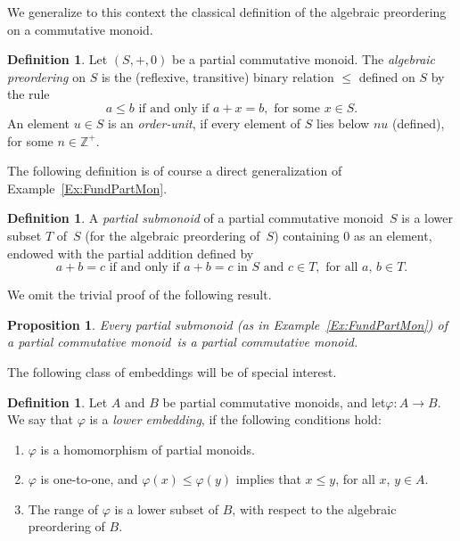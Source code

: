 \documentclass[psamsfonts,reqno]{memo-l}
\theoremstyle{plain}
\newtheorem{proposition}[lemma]{Proposition}
\theoremstyle{definition}
\newtheorem{definition}[lemma]{Definition}
\theoremstyle{remark}
\numberwithin{equation}{section}
\renewcommand{\iff}{if and only if}
\newcommand{\pup}[1]{\textup{(}{#1}\textup{)}}
\newcommand{\ZZ}{\mathbb{Z}}
\newcommand{\cm}{commutative mon\-oid}
\newcommand{\pcm}{partial commutative mon\-oid}
\begin{document}
We generalize to this context the classical definition of the algebraic
preordering on a \cm.

\begin{definition}\label{D:AlgPr}
Let $(S,+,0)$ be a \pcm. The
\emph{algebraic preordering} on $S$ is the (reflexive, transitive) binary
relation $\leq$ defined on $S$ by the rule
   \[
   a\leq b\text{ \iff\ }a+x=b,\text{ for some }x\in S.
   \]
An element $u\in S$ is an \emph{order-unit}, if every element of $S$ lies
below $nu$ (defined), for some $n\in\ZZ^+$.
\end{definition}

The following definition is of course a direct generalization of
Example~\ref{Ex:FundPartMon}.

\begin{definition}\label{D:PartSubm}
A \emph{partial submonoid} of a \pcm{}~$S$
is a lower subset $T$ of~$S$ (for the algebraic preordering of~$S$)
containing $0$ as an element, endowed with the partial addition defined by
   \[
   a+b=c\text{ \iff\ }a+b=c\text{ in }S\text{ and }c\in T,
   \text{ for all }a,\,b\in T.
   \]
\end{definition}

We omit the trivial proof of the following result.

\begin{proposition}
Every partial submonoid \pup{as in Example~\textup{\ref{Ex:FundPartMon}}} of
a \pcm{}\ is a \pcm.
\end{proposition}

The following class of embeddings will be of special interest.

\begin{definition}\label{D:LowEmb}
Let $A$ and $B$ be \pcm s, and
let\linebreak $\varphi\colon A\to B$. We say that
$\varphi$ is a \emph{lower embedding},
 if the following conditions hold:
\begin{enumerate}
\item $\varphi$ is a homomorphism of partial monoids.

\item $\varphi$ is one-to-one, and $\varphi(x)\leq\varphi(y)$ implies that
$x\leq y$, for all $x$, $y\in A$.

\item The range of $\varphi$ is a lower subset of $B$, with respect to the
algebraic preordering of $B$.
\end{enumerate}
\end{definition}
\end{document}
